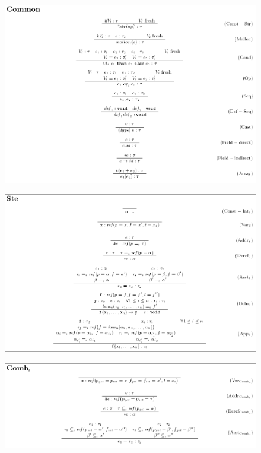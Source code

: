 \documentclass{beamer}
\begin{document}
\begin{frame}
  \begin{figure}
    \centering
    \includegraphics[scale=0.3]{common_inference_rules.png}
  \end{figure}
\end{frame}

\begin{frame}
  \begin{figure}
    \centering
    \includegraphics[scale=0.3]{steensgard_inference_rules.png}
  \end{figure}
\end{frame}

\begin{frame}
  \begin{figure}
    \centering
    \includegraphics[scale=0.3]{combination_inference_rules.png}
  \end{figure}
\end{frame}
\end{document}

